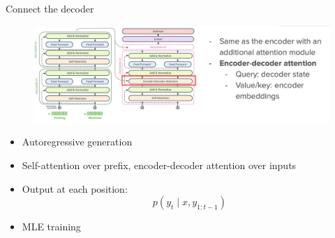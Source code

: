 \documentclass[usenames,dvipsnames,11pt,aspectratio=169]{beamer}
\begin{document}
\begin{frame}
    {Connect the decoder}
    \begin{figure}
        \includegraphics[width=\textwidth]{figures/decoder}
    \end{figure}
    \begin{itemize}
                        \item Autoregressive generation
                        \item Self-attention over prefix, encoder-decoder attention over inputs
                \item Output at each position:
                    $$
                    p(y_t\mid x, y_{1:t-1})
                    $$
                \item MLE training
    \end{itemize}
\end{frame}

\end{document}
